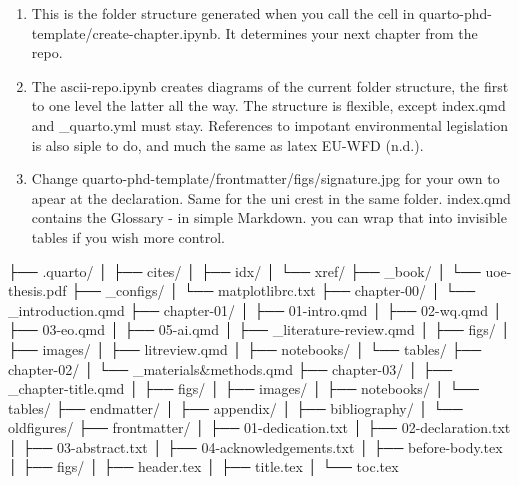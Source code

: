 \documentclass[
  a4paper,
  twoside]{uoe-thesis-template}
\newenvironment{Shaded}{\begin{snugshade}}{\end{snugshade}}
\newcommand{\NormalTok}[1]{\textcolor[rgb]{0.00,0.23,0.31}{#1}}
\begin{document}
\begin{enumerate}
\def\labelenumi{\arabic{enumi}.}
\item
  This is the folder structure generated when you call the cell in
  quarto-phd-template/create-chapter.ipynb. It determines your next
  chapter from the repo.
\item
  The ascii-repo.ipynb creates diagrams of the current folder structure,
  the first to one level the latter all the way. The structure is
  flexible, except index.qmd and \_quarto.yml must stay. References to
  impotant environmental legislation is also siple to do, and much the
  same as latex EU-WFD (n.d.).
\item
  Change quarto-phd-template/frontmatter/figs/signature.jpg for your own
  to apear at the declaration. Same for the uni crest in the same
  folder. index.qmd contains the Glossary - in simple Markdown. you can
  wrap that into invisible tables if you wish more control.
\end{enumerate}

\begin{Shaded}
\begin{Highlighting}[]
\NormalTok{├── .quarto/}
\NormalTok{│   ├── cites/}
\NormalTok{│   ├── idx/}
\NormalTok{│   └── xref/}
\NormalTok{├── \_book/}
\NormalTok{│   └── uoe{-}thesis.pdf}
\NormalTok{├── \_configs/}
\NormalTok{│   └── matplotlibrc.txt}
\NormalTok{├── chapter{-}00/}
\NormalTok{│   └── \_introduction.qmd}
\NormalTok{├── chapter{-}01/}
\NormalTok{│   ├── 01{-}intro.qmd}
\NormalTok{│   ├── 02{-}wq.qmd}
\NormalTok{│   ├── 03{-}eo.qmd}
\NormalTok{│   ├── 05{-}ai.qmd}
\NormalTok{│   ├── \_literature{-}review.qmd}
\NormalTok{│   ├── figs/}
\NormalTok{│   ├── images/}
\NormalTok{│   ├── litreview.qmd}
\NormalTok{│   ├── notebooks/}
\NormalTok{│   └── tables/}
\NormalTok{├── chapter{-}02/}
\NormalTok{│   └── \_materials\&methods.qmd}
\NormalTok{├── chapter{-}03/}
\NormalTok{│   ├── \_chapter{-}title.qmd}
\NormalTok{│   ├── figs/}
\NormalTok{│   ├── images/}
\NormalTok{│   ├── notebooks/}
\NormalTok{│   └── tables/}
\NormalTok{├── endmatter/}
\NormalTok{│   ├── appendix/}
\NormalTok{│   ├── bibliography/}
\NormalTok{│   └── oldfigures/}
\NormalTok{├── frontmatter/}
\NormalTok{│   ├── 01{-}dedication.txt}
\NormalTok{│   ├── 02{-}declaration.txt}
\NormalTok{│   ├── 03{-}abstract.txt}
\NormalTok{│   ├── 04{-}acknowledgements.txt}
\NormalTok{│   ├── before{-}body.tex}
\NormalTok{│   ├── figs/}
\NormalTok{│   ├── header.tex}
\NormalTok{│   ├── title.tex}
\NormalTok{│   └── toc.tex}
\end{Highlighting}
\end{Shaded}
\end{document}
